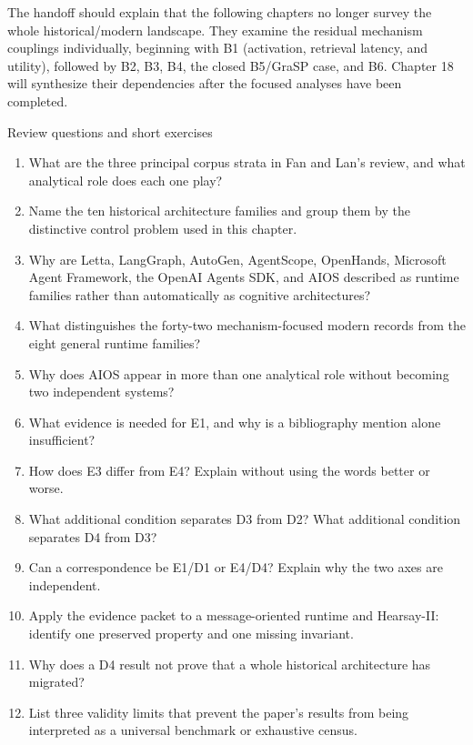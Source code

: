 The handoff should explain that the following chapters no longer survey the whole historical/modern landscape. They examine the residual mechanism couplings individually, beginning with B1 (activation, retrieval latency, and utility), followed by B2, B3, B4, the closed B5/GraSP case, and B6. Chapter 18 will synthesize their dependencies after the focused analyses have been completed.

\begin{reviewquestions}{Review questions and short exercises}
\begin{enumerate}
  \item What are the three principal corpus strata in Fan and Lan's review, and what analytical role does each one play?
  \item Name the ten historical architecture families and group them by the distinctive control problem used in this chapter.
  \item Why are Letta, LangGraph, AutoGen, AgentScope, OpenHands, Microsoft Agent Framework, the OpenAI Agents SDK, and AIOS described as runtime families rather than automatically as cognitive architectures?
  \item What distinguishes the forty-two mechanism-focused modern records from the eight general runtime families?
  \item Why does AIOS appear in more than one analytical role without becoming two independent systems?
  \item What evidence is needed for E1, and why is a bibliography mention alone insufficient?
  \item How does E3 differ from E4? Explain without using the words better or worse.
  \item What additional condition separates D3 from D2? What additional condition separates D4 from D3?
  \item Can a correspondence be E1/D1 or E4/D4? Explain why the two axes are independent.
  \item Apply the evidence packet to a message-oriented runtime and Hearsay-II: identify one preserved property and one missing invariant.
  \item Why does a D4 result not prove that a whole historical architecture has migrated?
  \item List three validity limits that prevent the paper's results from being interpreted as a universal benchmark or exhaustive census.
\end{enumerate}
\end{reviewquestions}

